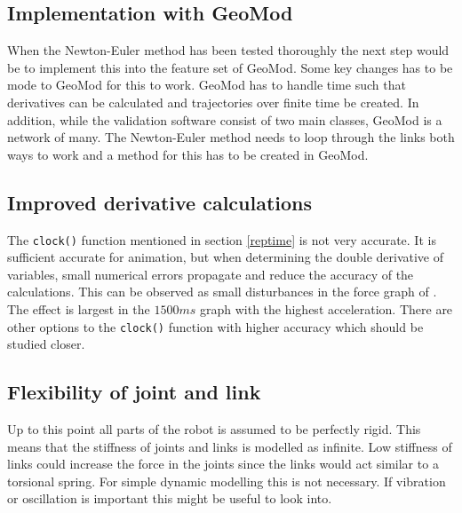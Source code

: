 \subsection{Implementation with GeoMod}
When the Newton-Euler method has been tested thoroughly the next step would be to implement this into the feature set of GeoMod. Some key changes has to be mode to GeoMod for this to work. GeoMod has to handle time such that derivatives can be calculated and trajectories over finite time be created. In addition, while the validation software consist of two main classes, GeoMod is a network of many. The Newton-Euler method needs to loop through the links both ways to work and a method for this has to be created in GeoMod.

\subsection{Improved derivative calculations}

The \texttt{clock()} function mentioned in section \ref{reptime} is not very accurate. It is sufficient accurate for animation, but when determining the double derivative of variables, small numerical errors propagate and reduce the accuracy of the calculations. This can be observed as small disturbances in the force graph of . The effect is largest in the $1500ms$ graph with the highest acceleration. There are other options to the \texttt{clock()} function with higher accuracy which should be studied closer.

\subsection{Flexibility of joint and link}

Up to this point all parts of the robot is assumed to be perfectly rigid. This means that the stiffness of joints and links is modelled as infinite. Low stiffness of links could increase the force in the joints since the links would act similar to a torsional spring. For simple dynamic modelling this is not necessary. If vibration or oscillation is important this might be useful to look into.
